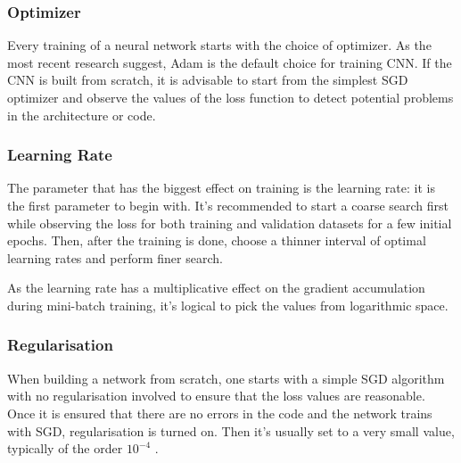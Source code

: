 \subsubsection{Optimizer}

Every training of a neural network starts with the choice of optimizer. As the most recent research suggest, Adam is the default choice for training CNN. If the CNN is built from scratch, it is advisable to start from the simplest SGD optimizer and observe the values of the loss function to detect potential problems in the architecture or code. \cite{stanford-L7}

\subsubsection{Learning Rate}

The parameter that has the biggest effect on training is the learning rate: it is the first parameter to begin with. It's recommended to start a coarse search first while observing the loss for both training and validation datasets for a few initial epochs. Then, after the training is done, choose a thinner interval of optimal learning rates and perform finer search. \cite{stanford-L6}

As the learning rate has a multiplicative effect on the gradient accumulation during mini-batch training, it's logical to pick the values from logarithmic space. \cite{stanford-L6}

\subsubsection{Regularisation}

When building a network from scratch, one starts with a simple SGD algorithm with no regularisation involved to ensure that the loss values are reasonable. Once it is ensured that there are no errors in the code and the network trains with SGD, regularisation is turned on. Then it's usually set to a very small value, typically of the order $ 10^{-4} $ \cite{stanford-L6}.



